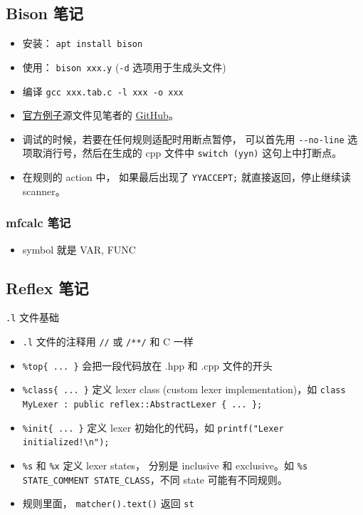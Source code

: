 \subsection{Bison 笔记}
\begin{itemize}
\item 安装： \verb`apt install bison`
\item 使用： \verb`bison xxx.y` (\verb`-d` 选项用于生成头文件)
\item 编译 \verb`gcc xxx.tab.c -l xxx -o xxx`
\item \href{http://web.mit.edu/gnu/doc/html/bison_5.html}{官方例子}源文件见笔者的 \href{https://github.com/MacroUniverse/bison_test}{GitHub}。
\item 调试的时候，若要在任何规则适配时用断点暂停， 可以首先用 \verb`--no-line` 选项取消行号，然后在生成的 cpp 文件中 \verb`switch (yyn)` 这句上中打断点。
\item 在规则的 action 中， 如果最后出现了 \verb`YYACCEPT;` 就直接返回，停止继续读 scanner。
\end{itemize}

\subsubsection{mfcalc 笔记}
\begin{itemize}
\item symbol 就是 VAR, FUNC
\end{itemize}

\subsection{Reflex 笔记}
\verb`.l` 文件基础
\begin{itemize}
\item \verb`.l` 文件的注释用 \verb`//` 或 \verb`/**/` 和 C 一样
\item \verb`%top{ ... }` 会把一段代码放在 .hpp 和 .cpp 文件的开头
\item \verb`%class{ ... }` 定义 lexer class (custom lexer implementation)，如 \verb`class MyLexer : public reflex::AbstractLexer { ... };`
\item \verb`%init{ ... }` 定义 lexer 初始化的代码，如 \verb`printf("Lexer initialized!\n");`
\item \verb`%s` 和 \verb`%x` 定义 lexer states， 分别是 inclusive 和 exclusive。如 \verb`%s STATE_COMMENT STATE_CLASS`，不同 state 可能有不同规则。
\item 规则里面， \verb`matcher().text()` 返回 \verb`st`
\end{itemize}

